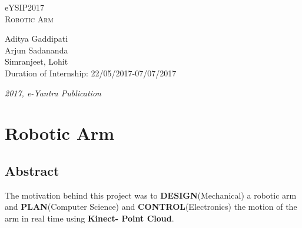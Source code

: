 \documentclass[a4paper,12pt,oneside]{book}
\begin{document}
	
	\begin{titlepage}
		\raggedright
		{\Large eYSIP2017\\[1cm]}
		{\Huge\scshape Robotic Arm \\[.1in]}
		\vfill
		\begin{flushright}
			{\large Aditya Gaddipati \\}
			{\large Arjun Sadananda \\}
			{\large Simranjeet, Lohit \\}
			{\large Duration of Internship: 22/05/2017-07/07/2017 \\}
		\end{flushright}
		
		{\itshape 2017, e-Yantra Publication}
	\end{titlepage}
	
	\chapter[Project Tag]{Robotic Arm}
	\section*{Abstract}
	The motivation behind this project was to \textbf{DESIGN}(Mechanical) a robotic arm and \textbf{PLAN}(Computer Science) and \textbf{CONTROL}(Electronics) the motion of the arm in real time using \textbf{Kinect- Point Cloud}.
	
\end{document}
